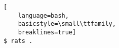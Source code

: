 \ApplyOnePageAppendixPageStyle{}

\begin{lstlisting}[
	language=bash,
	basicstyle=\small\ttfamily,
	breaklines=true]
$ rats .
\end{lstlisting}

\ApplyAppendixFirstPageStyle{}

\newpage
\ApplyAppendixLastPageStyle{}
